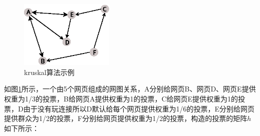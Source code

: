 \begin{figure}[htbp]
\centering
\includegraphics[width=0.4\textwidth]{myfigures/pagerank}
\caption{kruskal算法示例}\label{fig:pagerank}
\vspace{\baselineskip}
\end{figure}

如图\ref{fig:pagerank}所示，一个由5个网页组成的网图关系，A分别给网页B、网页D、网页E提供权重为1/3的投票，B给网页A提供权重为1的投票，C给网页E提供权重为1的投票，D由于没有玩连接所以D默认给每个网页提供权重为1/6的投票，E分别给网页提供群众为1/2的投票，F分别给网页提供权重为1/2的投票，构造的投票的矩阵$h$如下所示：
